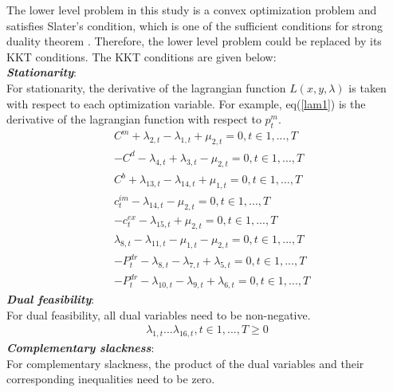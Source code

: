 The lower level problem in this study is a convex optimization problem and satisfies Slater's condition, which is one of the sufficient conditions for strong duality theorem \cite{convex}. Therefore, the lower level problem could be replaced by its KKT conditions. The KKT conditions are given below:\\
\textbf{\emph{Stationarity}}: \\
For stationarity, the derivative of the lagrangian function  $\textit{L}(x,y,\lambda)$ is taken with respect to each optimization variable. For example, eq(\ref{lam1}) is the derivative of the lagrangian function with respect to $p^m_t$.
\begin{align}
& C^m + \lambda_{2,t}-\lambda_{1,t}+\mu_{2,t} =0 , t\in{1,...,T} \label{lam1}\\
& -C^d - \lambda_{4,t}+\lambda_{3,t}-\mu_{2,t}=0 , t\in{1,...,T} \\
& C^b + \lambda_{13,t}-\lambda_{14,t}+\mu_{1,t} =0 , t\in{1,...,T} \\
& c^{im}_{t} - \lambda_{14,t} - \mu_{2,t} =0 , t\in{1,...,T} \\
& -c^{ex}_{t} - \lambda_{15,t} + \mu_{2,t} =0 , t\in{1,...,T} \\
& \lambda_{8,t} - \lambda_{11,t} - \mu_{1,t} - \mu_{2,t}  =0 , t\in{1,...,T} \\
& -P^{dr}_t - \lambda_{8,t} - \lambda_{7,t} +\lambda_{5,t}  =0 , t\in{1,...,T} \\
& -P^{dr}_t - \lambda_{10,t} - \lambda_{9,t} +\lambda_{6,t}  =0 , t\in{1,...,T} 
\end{align}
\textbf{\emph{Dual feasibility}}: \\
For dual feasibility, all dual variables need to be non-negative.
\begin{align}
\lambda_{1,t} ... \lambda_{16,t} , t\in{1,...,T} \geq 0 
\end{align}
\textbf{\emph{Complementary slackness}}: \\
For complementary slackness, the product of the dual variables and their corresponding inequalities need to be zero.
